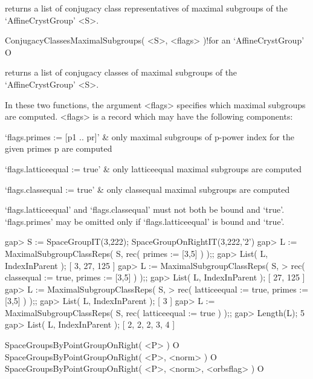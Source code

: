 returns a list of conjugacy class representatives of maximal subgroups
of the `AffineCrystGroup' <S>.

\>ConjugacyClassesMaximalSubgroups( <S>, <flags> )!{for an `AffineCrystGroup'} O

returns a list of conjugacy classes of maximal subgroups
of the `AffineCrystGroup' <S>.

In these two functions, the argument <flags> specifies which maximal
subgroups are computed. <flags> is a record which may have the following
components:

\beginitems

   `flags.primes := [p1 .. pr]' &
   only maximal subgroups of p-power index for the given primes p are 
   computed 

   `flags.latticeequal := true' &
   only latticeequal maximal subgroups are computed

   `flags.classequal := true' &
   only classequal maximal subgroups are computed

\enditems

`flags.latticeequal' and `flags.classequal' must not both be bound
and `true'. `flags.primes' may be omitted only if `flags.latticeequal' 
is bound and `true'.

\beginexample
gap> S := SpaceGroupIT(3,222);
SpaceGroupOnRightIT(3,222,'2')
gap> L := MaximalSubgroupClassReps( S, rec( primes := [3,5] ) );;
gap> List( L, IndexInParent );
[ 3, 27, 125 ]
gap> L := MaximalSubgroupClassReps( S,             
>                  rec( classequal := true, primes := [3,5] ) );;
gap> List( L, IndexInParent );                                                 
[ 27, 125 ]
gap> L := MaximalSubgroupClassReps( S,
>                  rec( latticeequal := true, primes := [3,5] ) );;
gap> List( L, IndexInParent );                                       
[ 3 ]
gap> L := MaximalSubgroupClassReps( S, rec( latticeequal := true ) );;
gap> Length(L);
5
gap> List( L, IndexInParent );                                       
[ 2, 2, 2, 3, 4 ]
\endexample



\>SpaceGroupsByPointGroupOnRight( <P> ) O
\>SpaceGroupsByPointGroupOnRight( <P>, <norm> ) O
\>SpaceGroupsByPointGroupOnRight( <P>, <norm>, <orbsflag> ) O

